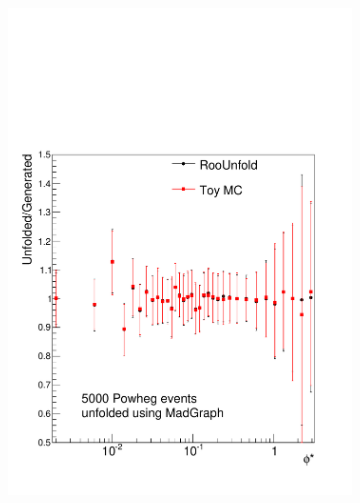 \begin{figure}[!htbp]
    \centering
    \begin{subfigure}[b]{\SideBySidePlotWidth}
        \includegraphics[width=\textwidth]{figures/BinM_MP_5000.pdf}
        \caption{}
        \label{fig:unfolding_5000}
    \end{subfigure}%
    \begin{subfigure}[b]{\SideBySidePlotWidth}

\end{subfigure}
\end{figure}
